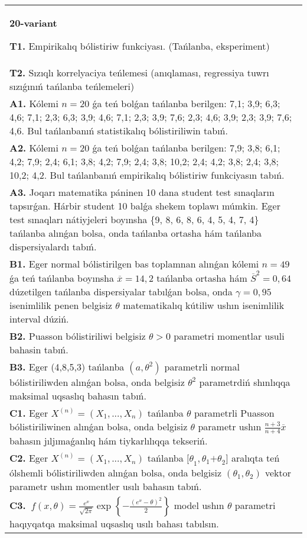 \documentclass{article}
\begin{document}
\begin{tabular}{m{17cm}}
\end{tabular}
\vspace{1cm}


\begin{tabular}{m{17cm}}
\textbf{20-variant}
\newline

\textbf{T1.} 
Empirikalıq bólistiriw funkciyası. (Tańlanba, eksperiment)
 \\
\textbf{T2.} 
Sızıqlı korrelyaciya teńlemesi (anıqlaması, regressiya tuwrı sızıǵınıń tańlanba teńlemeleri)
 \\
\textbf{A1.} 
Kólemi \(n = 20\) ǵa teń bolǵan tańlanba berilgen: 7,1; 3,9; 6,3; 4,6; 7,1; 2,3; 6,3; 3,9; 4,6; 7,1; 2,3; 3,9; 7,6; 2,3; 4,6; 3,9; 2,3; 3,9; 7,6; 4,6. Bul tańlanbanıń statistikalıq bólistiriliwin tabıń.
 \\
\textbf{A2.} 
Kólemi \(n = 20\) ǵa teń bolǵan tańlanba berilgen: 7,9; 3,8; 6,1; 4,2; 7,9; 2,4; 6,1; 3,8; 4,2; 7,9; 2,4; 3,8; 10,2; 2,4; 4,2; 3,8; 2,4; 3,8; 10,2; 4,2. Bul tańlanbanıń empirikalıq bólistiriw funkciyasın tabıń.
 \\
\textbf{A3.} 
Joqarı matematika páninen 10 dana student test sınaqların tapsırǵan. Hárbir student 10 balǵa shekem toplawı múmkin. Eger test sınaqları nátiyjeleri boyınsha \{9, 8, 6, 8, 6, 4, 5, 4, 7, 4\} tańlanba alınǵan bolsa, onda tańlanba ortasha hám tańlanba dispersiyalardı tabıń.
 \\
\textbf{B1.} 
Eger normal bólistirilgen bas toplamnan alınǵan kólemi \(n = 49\) ǵa teń tańlanba boyınsha \(\overline{x} = 14,2\) tańlanba ortasha hám \({\overline{S}}^{2} = 0,64\) dúzetilgen tańlanba dispersiyalar tabılǵan bolsa, onda \(\gamma = 0,95\) isenimlilik penen belgisiz \(\theta\) matematikalıq kútiliw ushın isenimlilik interval dúziń.
 \\
\textbf{B2.} 
Puasson bólistiriliwi belgisiz \(\theta > 0\) parametri momentlar usuli bahasin tabıń.
 \\
\textbf{B3.} 
Eger (4,8,5,3) tańlanba \(\left( a,\theta^{2} \right)\) parametrli normal bólistiriliwden alınǵan bolsa, onda belgisiz \(\theta^{2}\) parametrdiń shınlıqqa maksimal uqsaslıq bahasın tabıń.
 \\
\textbf{C1.} 
Eger \(X^{(n)} = \left( X_{1},...,X_{n} \right)\) tańlanba \(\theta\) parametrli Puasson bólistiriliwinen alınǵan bolsa, onda belgisiz \(\theta\) parametr ushın \(\frac{n + 3}{n + 4}\overline{x}\) bahasın jıljımaǵanlıq hám tiykarlılıqqa tekseriń.
 \\
\textbf{C2.} 
Eger \(X^{(n)} = \left( X_{1},...,X_{n} \right)\) tańlanba \({\lbrack\theta}_{1},\theta_{1}{+ \theta}_{2}\rbrack\) aralıqta teń ólshemli bólistiriliwden alınǵan bolsa, onda belgisiz \(\left( \theta_{1},\theta_{2} \right)\) vektor parametr ushın momentler usılı bahasın tabıń.
 \\
\textbf{C3.} 
\(\ f(x,\theta) = \frac{e^{x}}{\sqrt{2\pi}}\exp\left\{ - \frac{\left( e^{x} - \theta \right)^{2}}{2} \right\}\) model ushın \(\theta\) parametri haqıyqatqa maksimal uqsaslıq usılı bahası tabılsın.
 \\

\end{tabular}
\vspace{1cm}
\end{document}
